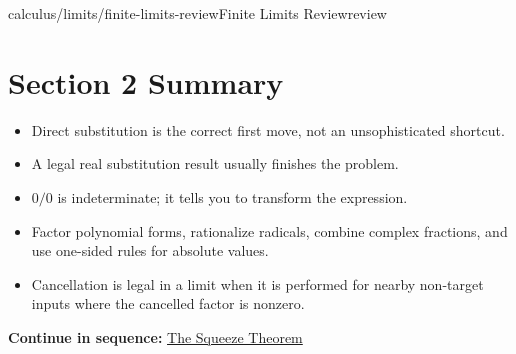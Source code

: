 \documentclass[11pt,openany]{book}
\theoremstyle{bgplain}
\newcommand{\webnext}[2]{%
  \par\addvspace{1.2em}\noindent{\color{BGLine}\rule{\textwidth}{0.35pt}}\par\smallskip
  {\small\color{BGGray}\textbf{Continue in sequence:} \hyperlink{web:#1}{#2}}\par
}
\begin{document}
\begin{webpage}{calculus/limits/finite-limits-review}{Finite Limits Review}{review}
\section*{Section 2 Summary}

\begin{bgsummary}
\begin{itemize}
  \item Direct substitution is the correct first move, not an unsophisticated shortcut.
  \item A legal real substitution result usually finishes the problem.
  \item \(0/0\) is indeterminate; it tells you to transform the expression.
  \item Factor polynomial forms, rationalize radicals, combine complex fractions, and use one-sided rules for absolute values.
  \item Cancellation is legal in a limit when it is performed for nearby non-target inputs where the cancelled factor is nonzero.
\end{itemize}
\end{bgsummary}
\webnext{calculus/limits/squeeze-theorem}{The Squeeze Theorem}
\end{webpage}
\end{document}
